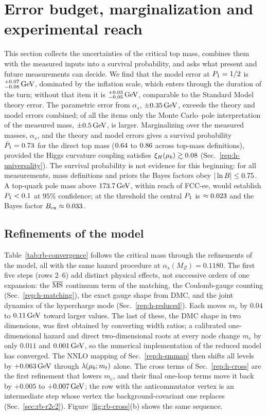 \section{Error budget, marginalization and experimental reach}\label{rep:h-budget}

This section collects the uncertainties of the critical top mass, combines them with the measured inputs into a survival probability, and asks what present and future measurements can decide.
We find that the model error at $P_1=1/2$ is $^{+0.07}_{-0.08}\,\mathrm{GeV}$, dominated by the inflation scale, which enters through the duration of the turn; without that item it is $^{+0.03}_{-0.05}\,\mathrm{GeV}$, comparable to the Standard Model theory error. %
The parametric error from $\alpha_s$, $\pm0.35\,\mathrm{GeV}$, exceeds the theory and model errors combined; of all the items only the Monte Carlo--pole interpretation of the measured mass, $\pm0.5\,\mathrm{GeV}$, is larger. %
Marginalizing over the measured masses, $\alpha_s$, and the theory and model errors gives a survival probability $\bar P_1=0.73$ for the direct top mass ($0.64$ to $0.86$ across top-mass definitions), provided the Higgs curvature coupling satisfies $\xi_H(\mu_b)\gtrsim0.08$ (Sec.~\ref{rep:h-universality}). %
The survival probability is not evidence for this beginning: for all measurements, mass definitions and priors the Bayes factors obey $|\ln B|\le0.75$. %
A top-quark pole mass above $173.7\,\mathrm{GeV}$, within reach of FCC-ee, would establish $P_1<0.1$ at $95\%$ confidence; at the threshold the central $P_1$ is $\approx0.023$ and the Bayes factor $B_{\rm ex}\approx0.033$. %

\subsection{Refinements of the model}
\label{sec:rb-convergence}

Table~\ref{tab:rb-convergence} follows the critical mass through the refinements of the model, all with the same hazard procedure at $\alpha_s(M_Z)=0.1180$. %
The first five steps (rows 2--6) add distinct physical effects, not successive orders of one expansion: the $\overline{\mathrm{MS}}$ continuum term of the matching, the Coulomb-gauge counting (Sec.~\ref{rep:h-matching}), the exact gauge shape from DMC, and the joint dynamics of the hypercharge mode (Sec.~\ref{rep:h-reduced}).
Each moves $m_c$ by $0.04$ to $0.11\,\mathrm{GeV}$ toward larger values. %
The last of these, the DMC shape in two dimensions, was first obtained by converting width ratios; a calibrated one-dimensional hazard and direct two-dimensional roots at every node change $m_c$ by only $0.011$ and $0.001\,\mathrm{GeV}$, so the numerical implementation of the reduced model has converged. %
The NNLO mapping of Sec.~\ref{rep:h-smmap} then shifts all levels by $+0.063\,\mathrm{GeV}$ through $\lambda(\mu_b;m_t)$ alone. %
The cross terms of Sec.~\ref{rep:h-cross} are the first refinement that lowers $m_c$, and their final one-loop terms move it back by $+0.005$ to $+0.007\,\mathrm{GeV}$; the row with the anticommutator vertex is an intermediate step whose vertex the background-covariant one replaces (Sec.~\ref{sec:rb-r2c2}). %
Figure~\ref{fig:rb-cross}(b) shows the same sequence.

